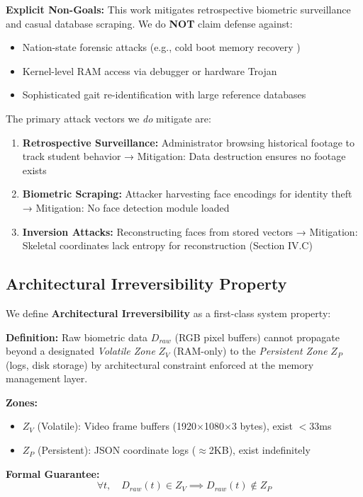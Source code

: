 \documentclass[conference]{IEEEtran}
\begin{document}
\textbf{Explicit Non-Goals:} This work mitigates retrospective biometric surveillance and casual database scraping. We do \textbf{NOT} claim defense against:
\begin{itemize}
    \item Nation-state forensic attacks (e.g., cold boot memory recovery \cite{b21})
    \item Kernel-level RAM access via debugger or hardware Trojan \cite{b19}
    \item Sophisticated gait re-identification with large reference databases
\end{itemize}

The primary attack vectors we \textit{do} mitigate are:
\begin{enumerate}
    \item \textbf{Retrospective Surveillance:} Administrator browsing historical footage to track student behavior → Mitigation: Data destruction ensures no footage exists
    \item \textbf{Biometric Scraping:} Attacker harvesting face encodings for identity theft → Mitigation: No face detection module loaded
    \item \textbf{Inversion Attacks:} Reconstructing faces from stored vectors → Mitigation: Skeletal coordinates lack entropy for reconstruction (Section IV.C)
\end{enumerate}

\subsection{Architectural Irreversibility Property}
We define \textbf{Architectural Irreversibility} as a first-class system property:

\textbf{Definition:} Raw biometric data $D_{raw}$ (RGB pixel buffers) cannot propagate beyond a designated \textit{Volatile Zone} $Z_V$ (RAM-only) to the \textit{Persistent Zone} $Z_P$ (logs, disk storage) by architectural constraint enforced at the memory management layer.

\textbf{Zones:}
\begin{itemize}
    \item $Z_V$ (Volatile): Video frame buffers (1920$\times$1080$\times$3 bytes), exist $<$33ms
    \item $Z_P$ (Persistent): JSON coordinate logs ($\approx$2KB), exist indefinitely
\end{itemize}

\textbf{Formal Guarantee:}
$$\forall t, \quad D_{raw}(t) \in Z_V \implies D_{raw}(t) \notin Z_P$$
\end{document}
